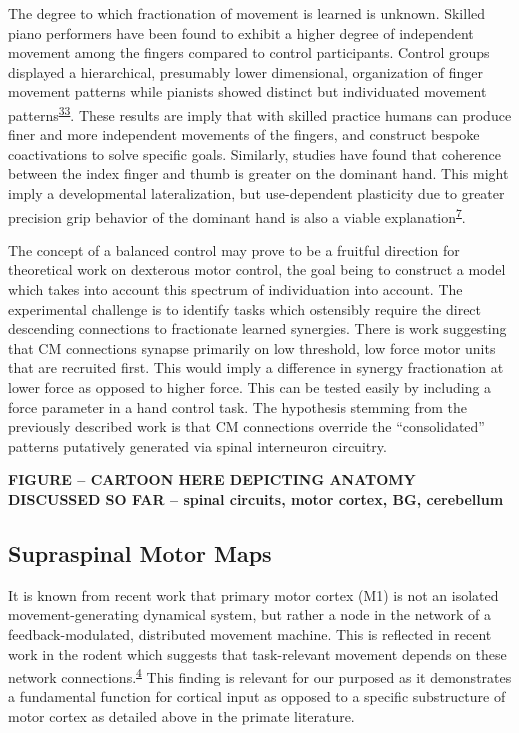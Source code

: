 \documentclass[
  a4paper,
]{article}
\begin{document}
The degree to which fractionation of movement is learned is unknown.
Skilled piano performers have been found to exhibit a higher degree of
independent movement among the fingers compared to control participants.
Control groups displayed a hierarchical, presumably lower dimensional,
organization of finger movement patterns while pianists showed distinct
but individuated movement
patterns\textsuperscript{\protect\hyperlink{ref-furuyaFlexibilityMovementOrganization2013}{33}}.
These results are imply that with skilled practice humans can produce
finer and more independent movements of the fingers, and construct
bespoke coactivations to solve specific goals. Similarly, studies have
found that coherence between the index finger and thumb is greater on
the dominant hand. This might imply a developmental lateralization, but
use-dependent plasticity due to greater precision grip behavior of the
dominant hand is also a viable
explanation\textsuperscript{\protect\hyperlink{ref-fuglevandMechanicalPropertiesNeural2011}{7}}.

The concept of a balanced control may prove to be a fruitful direction
for theoretical work on dexterous motor control, the goal being to
construct a model which takes into account this spectrum of
individuation into account. The experimental challenge is to identify
tasks which ostensibly require the direct descending connections to
fractionate learned synergies. There is work suggesting that CM
connections synapse primarily on low threshold, low force motor units
that are recruited first. This would imply a difference in synergy
fractionation at lower force as opposed to higher force. This can be
tested easily by including a force parameter in a hand control task. The
hypothesis stemming from the previously described work is that CM
connections override the ``consolidated'' patterns putatively generated
via spinal interneuron circuitry.

\textbf{FIGURE -- CARTOON HERE DEPICTING ANATOMY DISCUSSED SO FAR --
spinal circuits, motor cortex, BG, cerebellum}

\hypertarget{supraspinal-motor-maps}{%
\subsection{Supraspinal Motor Maps}\label{supraspinal-motor-maps}}

It is known from recent work that primary motor cortex (M1) is not an
isolated movement-generating dynamical system, but rather a node in the
network of a feedback-modulated, distributed movement machine. This is
reflected in recent work in the rodent which suggests that task-relevant
movement depends on these network
connections.\textsuperscript{\protect\hyperlink{ref-sauerbreiCorticalPatternGeneration2019}{4}}
This finding is relevant for our purposed as it demonstrates a
fundamental function for cortical input as opposed to a specific
substructure of motor cortex as detailed above in the primate
literature.
\end{document}
